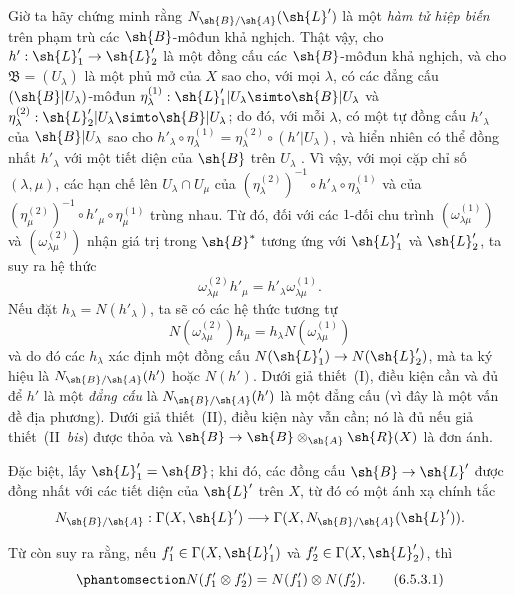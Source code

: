 \documentclass[oneside,10pt]{amsart}
\makeatletter
\newcommand{\ega@arrow}[2]{\mathchoice{#1}{#2}{#2}{#2}}
\renewcommand{\to}{\ega@arrow{\longrightarrow}{\rightarrow}}
\newcommand{\oldpage}[2][]{\marginnote{\normalfont\footnotesize\textbf{#1}~|~#2}\ignorespaces}
\let\EGAOriginalLabel\label
\renewcommand{\label}[1]{\phantomsection\EGAOriginalLabel{#1}}
\makeatother
\begin{document}
\begin{env}[6.5.3]
\label{II.6.5.3}
Giờ ta hãy chứng minh rằng $N_{\sh{B}/\sh{A}}(\sh{L}')$ là một \emph{hàm tử hiệp biến} trên phạm trù các $\sh{B}$-môđun khả nghịch.
Thật vậy, cho $h':\sh{L}'_1\to\sh{L}'_2$ là một đồng cấu các $\sh{B}$-môđun khả nghịch, và cho $\mathfrak{B}=(U_\lambda)$ là một phủ mở của $X$ sao cho, với mọi $\lambda$, có các đẳng cấu $(\sh{B}|U_\lambda)$-môđun $\eta_\lambda^{(1)}:\sh{L}'_1|U_\lambda\simto\sh{B}|U_\lambda$ và $\eta_\lambda^{(2)}:\sh{L}'_2|U_\lambda\simto\sh{B}|U_\lambda$;
do đó, với mỗi $\lambda$, có một tự đồng cấu $h'_\lambda$ của $\sh{B}|U_\lambda$ sao cho $h'_\lambda\circ\eta_\lambda^{(1)}=\eta_\lambda^{(2)}\circ(h'|U_\lambda)$, và hiển nhiên có thể đồng nhất $h'_\lambda$ với một tiết diện của $\sh{B}$ trên $U_\lambda$ .
Vì vậy, với mọi cặp chỉ số $(\lambda,\mu)$, các hạn chế lên $U_\lambda\cap U_\mu$ của $(\eta_\lambda^{(2)})^{-1}\circ h'_\lambda\circ\eta_\lambda^{(1)}$ và của $(\eta_\mu^{(2)})^{-1}\circ h'_\mu\circ\eta_\mu^{(1)}$ trùng nhau.
Từ đó, đối với các $1$-đối chu trình $(\omega_{\lambda\mu}^{(1)})$ và $(\omega_{\lambda\mu}^{(2)})$ nhận giá trị trong $\sh{B}^*$ tương ứng với $\sh{L}'_1$ và $\sh{L}'_2$, ta suy ra hệ thức
\[
  \omega_{\lambda\mu}^{(2)}h'_\mu = h'_\lambda\omega_{\lambda\mu}^{(1)}.
\]
\oldpage[II]{128}
Nếu đặt $h_\lambda=N(h'_\lambda)$, ta sẽ có các hệ thức tương tự
\[
  N(\omega_{\lambda\mu}^{(2)})h_\mu = h_\lambda N(\omega_{\lambda\mu}^{(1)})
\]
và do đó các $h_\lambda$ xác định một đồng cấu $N(\sh{L}'_1)\to N(\sh{L}'_2)$, mà ta ký hiệu là $N_{\sh{B}/\sh{A}}(h')$ hoặc $N(h')$.
Dưới giả thiết~(I), điều kiện cần và đủ để $h'$ là một \emph{đẳng cấu} là $N_{\sh{B}/\sh{A}}(h')$ là một đẳng cấu (vì đây là một vấn đề địa phương).
Dưới giả thiết~(II), điều kiện này vẫn cần;
nó là đủ nếu giả thiết~(II~\emph{bis}) được thỏa và $\sh{B}\to\sh{B}\otimes_{\sh{A}}\sh{R}(X)$ là đơn ánh.

Đặc biệt, lấy $\sh{L}'_1=\sh{B}$;
khi đó, các đồng cấu $\sh{B}\to\sh{L}'$ được đồng nhất  với các tiết diện của $\sh{L}'$ trên $X$, từ đó có một ánh xạ chính tắc
\[
  N_{\sh{B}/\sh{A}} : \Gamma(X,\sh{L}')\to\Gamma(X,N_{\sh{B}/\sh{A}}(\sh{L}')).
\]

Từ  còn suy ra rằng, nếu $f'_1\in\Gamma(X,\sh{L}'_1)$ và $f'_2\in\Gamma(X,\sh{L}'_2)$, thì
\[
\label{II.6.5.3.1}
  N(f'_1\otimes f'_2) = N(f'_1)\otimes N(f'_2).
\tag{6.5.3.1}
\]


\end{env}
\end{document}
